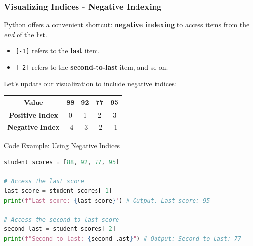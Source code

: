 \documentclass{beamer}
\begin{document}
\begin{frame}[fragile]
    \frametitle{Visualizing Indices - Negative Indexing}
    
    Python offers a convenient shortcut: \textbf{negative indexing} to access items from the \textit{end} of the list.
    
    \begin{itemize}
        \item \texttt{[-1]} refers to the \textbf{last} item.
        \item \texttt{[-2]} refers to the \textbf{second-to-last} item, and so on.
    \end{itemize}
    
    \pause
    
    Let's update our visualization to include negative indices:
    \begin{center}
    \begin{tabular}{|c|c|c|c|c|}
        \hline
        \textbf{Value} & 88 & 92 & 77 & 95 \\
        \hline
        \textbf{Positive Index} & 0 & 1 & 2 & 3 \\
        \hline
        \textbf{Negative Index} & -4 & -3 & -2 & -1 \\
        \hline
    \end{tabular}
    \end{center}
    
    \begin{exampleblock}{Code Example: Using Negative Indices}
\begin{lstlisting}[language=Python]
student_scores = [88, 92, 77, 95]

# Access the last score
last_score = student_scores[-1]
print(f"Last score: {last_score}") # Output: Last score: 95

# Access the second-to-last score
second_last = student_scores[-2]
print(f"Second to last: {second_last}") # Output: Second to last: 77
\end{lstlisting}
    \end{exampleblock}
    
\end{frame}
\end{document}
